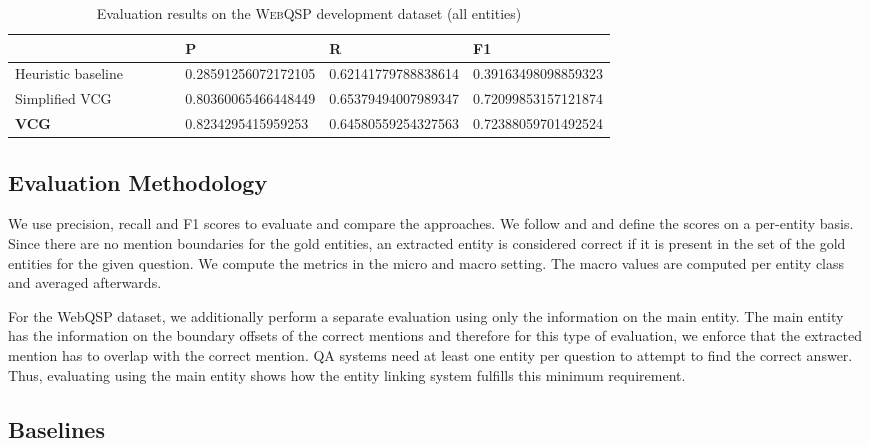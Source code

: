 \documentclass[11pt,a4paper]{article}
\begin{document}
\begin{table}[t]
  \begin{center}
    \begin{tabular}{>{\raggedleft}p{0.4\linewidth}
      >{\raggedleft}p{0.1\linewidth}
      >{\raggedleft}p{0.1\linewidth}   
      >{\raggedleft\arraybackslash}p{0.1\linewidth}}
    \toprule
    & P & R & F1\\ 
    \midrule 
Heuristic baseline  &  \num{0.28591256072172105} &  \num{0.62141779788838614} &  \num{0.39163498098859323} \\
  Simplified VCG & \num{0.80360065466448449} & \num{0.65379494007989347} & \num{0.72099853157121874} \\
  \textbf{VCG}  & \num{0.8234295415959253} & \num{0.64580559254327563} & \num{0.72388059701492524} \\ 
  \bottomrule
  \end{tabular} 
  \end{center}
  \caption{Evaluation results on the \textsc{WebQSP} development dataset (all entities) \label{table:eval-webqsp-dev}}
\end{table}

\subsection{Evaluation Methodology}

We use precision, recall and F1 scores to evaluate and compare the approaches. We follow \citet{Carmel2014} and \citet{Yang2015a} and define the scores on a per-entity basis. Since there are no mention boundaries for the gold entities, an extracted entity is considered correct if it is present in the set of the gold entities for the given question. We compute the metrics in the micro and macro setting. The macro values are computed per entity class and averaged afterwards. 

For the WebQSP dataset, we additionally perform a separate evaluation using only the information on the main entity. The main entity has the information on the boundary offsets of the correct mentions and therefore for this type of evaluation, we enforce that the extracted mention has to overlap with the correct mention. QA systems need at least one entity per question to attempt to find the correct answer. Thus, evaluating using the main entity shows how the entity linking system fulfills this minimum requirement.

\subsection{Baselines}
\end{document}
